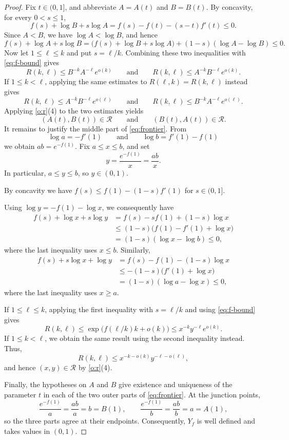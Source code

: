 \documentclass[reqno,final,12pt]{amsart}
\newcommand{\mc}[1]{\mathcal{#1}}
\begin{document}
\begin{proof}Fix \(t\in(0,1]\), and abbreviate \(A=A(t)\) and \(B=B(t)\).
	By concavity, for every \(0<s\leq1\),
	\begin{equation*}
		f(s)+\log B+s\log A
		=f(s)-f(t)-(s-t)f'(t)\leq0.
	\end{equation*}
	Since \(A<B\), we have \(\log A<\log B\), and hence
	\[
	f(s)+\log A+s\log B
	=\bigl(f(s)+\log B+s\log A\bigr)
	+(1-s)(\log A-\log B)
	\leq0.
	\]
	Now let \(1\leq\ell\leq k\) and put \(s=\ell/k\).  Combining these
	two inequalities with \eqref{eq:f-bound} gives
	\[
	R(k,\ell)
	\leq B^{-k}A^{-\ell}e^{o(k)}
	\qquad\text{and}\qquad
	R(k,\ell)
	\leq A^{-k}B^{-\ell}e^{o(k)}.
	\]
	If \(1\leq k<\ell\), applying the same estimates to
	\(R(\ell,k)=R(k,\ell)\) instead gives
	\[
	R(k,\ell)
	\leq A^{-k}B^{-\ell}e^{o(\ell)}
	\qquad\text{and}\qquad
	R(k,\ell)
	\leq B^{-k}A^{-\ell}e^{o(\ell)}.
	\]  Applying
	\cref{o:r}(4) to the two estimates yields
	\[
	(A(t),B(t))\in\mc{R}
	\qquad\text{and}\qquad
	(B(t),A(t))\in\mc{R}.
	\]
	It remains to justify the middle part of \eqref{eq:frontier}.  From
	\[
	\log a=-f'(1)
	\qquad\text{and}\qquad
	\log b=f'(1)-f(1)
	\]
	we obtain \(ab=e^{-f(1)}\).  Fix \(a\leq x\leq b\), and set
	\[
	y=\frac{e^{-f(1)}}{x}=\frac{ab}{x}.
	\]
	In particular, \(a\leq y\leq b\), so \(y\in(0,1)\).
	
	By concavity  we have $
	f(s)\leq f(1)-(1-s)f'(1)	$ for $s \in (0,1]$.

	Using \(\log y=-f(1)-\log x\), we consequently have
	\begin{align*}
		f(s)+\log x+s\log y
		&=f(s)-sf(1)+(1-s)\log x\\
		&\leq(1-s)\bigl(f(1)-f'(1)+\log x\bigr)\\
		&=(1-s)(\log x-\log b)\leq0,
	\end{align*}
	where the last inequality uses \(x\leq b\).  Similarly,
	\begin{align*}
		f(s)+s\log x+\log y
		&=f(s)-f(1)-(1-s)\log x\\
		&\leq-(1-s)\bigl(f'(1)+\log x\bigr)\\
		&=(1-s)(\log a-\log x)\leq0,
	\end{align*}
	where the last inequality uses \(x\geq a\).
	
	If \(1\leq\ell\leq k\), applying the first inequality with
	\(s=\ell/k\) and using \eqref{eq:f-bound} gives
	\[
	R(k,\ell)
	\leq \exp\bigl(f(\ell/k)k+o(k)\bigr)
	\leq x^{-k}y^{-\ell}e^{o(k)}.
	\] 
	If \(1\leq k<\ell\), we obtain the same result using the second  inequality instead.
	Thus, 
	\[
	R(k,\ell)\leq x^{-k-o(k)}y^{-\ell-o(\ell)},
	\]and hence
	\((x,y)\in\mc{R}\) by \cref{o:r}(4).
	
	Finally, the hypotheses on \(A\) and \(B\) give existence and
	uniqueness of the parameter \(t\) in each of the two outer parts of
	\eqref{eq:frontier}.  At the junction points,
	\[
	\frac{e^{-f(1)}}{a}=\frac{ab}{a}=b=B(1),
	\qquad
	\frac{e^{-f(1)}}{b}=\frac{ab}{b}=a=A(1),
	\]
	so the three parts agree at their endpoints.  Consequently,
	\(Y_f\) is well defined and takes values in \((0,1)\).
\end{proof}
\end{document}
